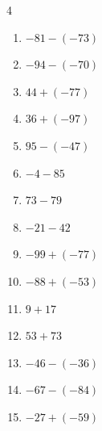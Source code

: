 \begin{multicols}{4}
\begin{enumerate}
        \phantom{$=26$}

  \item $-81-(-73)$

        \phantom{$=-8$}

  \item $-94-(-70)$

        \phantom{$=-24$}

  \item $44+(-77)$

        \phantom{$=-33$}

  \item $36+(-97)$

        \phantom{$=-61$}

  \item $95-(-47)$

        \phantom{$=142$}

  \item $-4-85$

        \phantom{$=-89$}

  \item $73-79$

        \phantom{$=-6$}

\columnbreak %

  \item $-21-42$

        \phantom{$=-63$}

  \item $-99+(-77)$

        \phantom{$=-176$}

  \item $-88+(-53)$

        \phantom{$=-141$}

  \item $9+17$

        \phantom{$=26$}

  \item $53+73$

        \phantom{$=126$}

  \item $-46-(-36)$

        \phantom{$=-10$}

  \item $-67-(-84)$

        \phantom{$=17$}

  \item $-27+(-59)$

        \phantom{$=-86$}


\end{enumerate}
\end{multicols}
